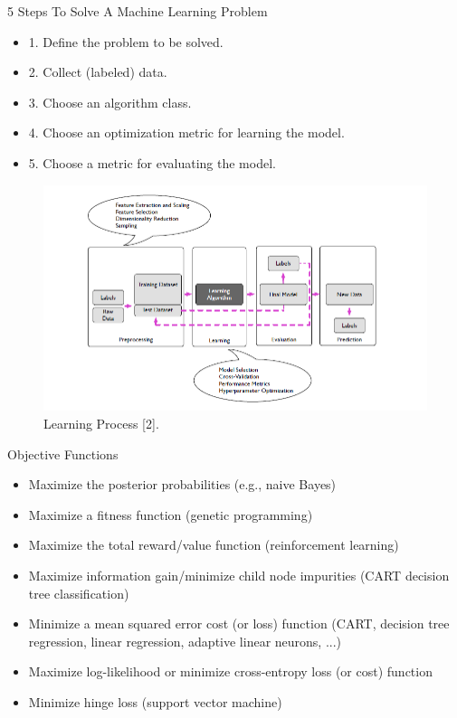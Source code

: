 \documentclass[compress,oilve]{beamer}
\begin{document}
\begin{frame}{5 Steps To Solve A Machine Learning Problem}
\begin{itemize}
\item 1. Define the problem to be solved.
\item 2. Collect (labeled) data.
\item 3. Choose an algorithm class.
\item 4. Choose an optimization metric for learning the model.
\item 5. Choose a metric for evaluating the model.
\end{itemize}
\begin{figure}
 \centering
 \includegraphics[scale=0.6]{13}  
 \caption{Learning Process [2].}
\end{figure}
\end{frame}

\begin{frame}{Objective Functions}
\begin{itemize}
\item Maximize the posterior probabilities (e.g., naive Bayes)
\item Maximize a fitness function (genetic programming)
\item Maximize the total reward/value function (reinforcement learning)
\item Maximize information gain/minimize child node impurities (CART decision tree classification)
\item Minimize a mean squared error cost (or loss) function (CART, decision tree regression, linear regression, adaptive linear neurons, ...)
\item Maximize log-likelihood or minimize cross-entropy loss (or cost) function
\item Minimize hinge loss (support vector machine)
\end{itemize}
\end{frame}
\end{document}
